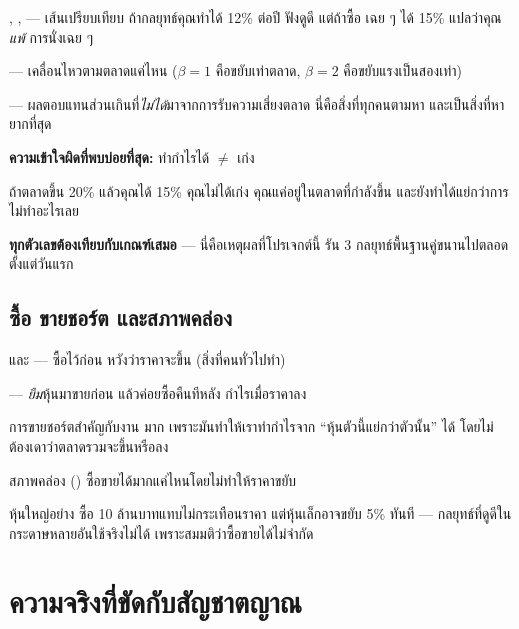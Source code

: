 \documentclass[11pt]{article}
\begin{document}
\begin{term}{, , }
\textbf{} --- เส้นเปรียบเทียบ ถ้ากลยุทธ์คุณทำได้ 12\% ต่อปี
ฟังดูดี แต่ถ้าซื้อ  เฉย ๆ ได้ 15\% แปลว่าคุณ \emph{แพ้} การนั่งเฉย ๆ

\textbf{} --- เคลื่อนไหวตามตลาดแค่ไหน ($\beta = 1$ คือขยับเท่าตลาด,
$\beta = 2$ คือขยับแรงเป็นสองเท่า)

\textbf{} --- ผลตอบแทนส่วนเกินที่\emph{ไม่ได้}มาจากการรับความเสี่ยงตลาด
นี่คือสิ่งที่ทุกคนตามหา และเป็นสิ่งที่หายากที่สุด
\end{term}

\begin{keypoint}
\textbf{ความเข้าใจผิดที่พบบ่อยที่สุด:} ทำกำไรได้ $\neq$ เก่ง

ถ้าตลาดขึ้น 20\% แล้วคุณได้ 15\% คุณไม่ได้เก่ง คุณแค่อยู่ในตลาดที่กำลังขึ้น
และยังทำได้แย่กว่าการไม่ทำอะไรเลย

\textbf{ทุกตัวเลขต้องเทียบกับเกณฑ์เสมอ} --- นี่คือเหตุผลที่โปรเจกต์นี้
รัน 3 กลยุทธ์พื้นฐานคู่ขนานไปตลอดตั้งแต่วันแรก
\end{keypoint}

\subsection{ซื้อ ขายชอร์ต และสภาพคล่อง}

\begin{term}{ และ }
\textbf{} --- ซื้อไว้ก่อน หวังว่าราคาจะขึ้น (สิ่งที่คนทั่วไปทำ)

\textbf{} --- \emph{ยืม}หุ้นมาขายก่อน แล้วค่อยซื้อคืนทีหลัง
กำไรเมื่อราคาลง

การขายชอร์ตสำคัญกับงาน  มาก เพราะมันทำให้เราทำกำไรจาก
``หุ้นตัวนี้แย่กว่าตัวนั้น'' ได้ โดยไม่ต้องเดาว่าตลาดรวมจะขึ้นหรือลง
\end{term}

\begin{term}{สภาพคล่อง ()}
ซื้อขายได้มากแค่ไหนโดยไม่ทำให้ราคาขยับ

หุ้นใหญ่อย่าง  ซื้อ 10 ล้านบาทแทบไม่กระเทือนราคา
แต่หุ้นเล็กอาจขยับ 5\% ทันที --- กลยุทธ์ที่ดูดีในกระดาษหลายอันใช้จริงไม่ได้
เพราะสมมติว่าซื้อขายได้ไม่จำกัด
\end{term}

\section{ความจริงที่ขัดกับสัญชาตญาณ}
\end{document}
